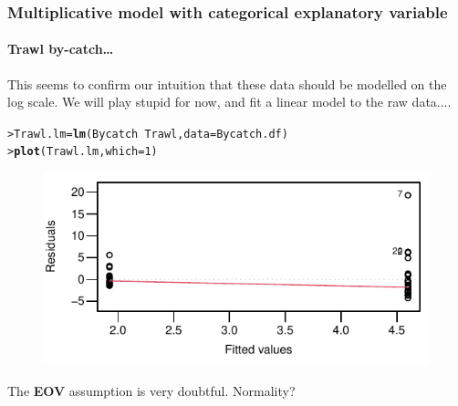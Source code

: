 \documentclass{beamer}\usepackage[]{graphicx}\usepackage[]{xcolor}
\makeatletter
\newcommand{\hlnum}[1]{\textcolor[rgb]{0.686,0.059,0.569}{#1}}%
\newcommand{\hlopt}[1]{\textcolor[rgb]{0,0,0}{#1}}%
\newcommand{\hlstd}[1]{\textcolor[rgb]{0.345,0.345,0.345}{#1}}%
\newcommand{\hlkwb}[1]{\textcolor[rgb]{0.69,0.353,0.396}{#1}}%
\newcommand{\hlkwc}[1]{\textcolor[rgb]{0.333,0.667,0.333}{#1}}%
\newcommand{\hlkwd}[1]{\textcolor[rgb]{0.737,0.353,0.396}{\textbf{#1}}}%
\newenvironment{kframe}{%
 \def\at@end@of@kframe{}%
 \ifinner\ifhmode%
  \def\at@end@of@kframe{\end{minipage}}%
  \begin{minipage}{\columnwidth}%
 \fi\fi%
 \def\FrameCommand##1{\hskip\@totalleftmargin \hskip-\fboxsep
 \colorbox{shadecolor}{##1}\hskip-\fboxsep
     \hskip-\linewidth \hskip-\@totalleftmargin \hskip\columnwidth}%
 \MakeFramed {\advance\hsize-\width
   \@totalleftmargin\z@ \linewidth\hsize
   \@setminipage}}%
 {\par\unskip\endMakeFramed%
 \at@end@of@kframe}
\newenvironment{knitrout}{}{} %
\makeatother
\begin{document}
\begin{frame}[fragile]
\frametitle{Multiplicative model with categorical explanatory variable}
\framesubtitle{Trawl by-catch\ldots}

This seems to confirm our intuition that these data should be modelled on the log scale.
We will play stupid for now, and fit a linear model to the raw data....

\begin{knitrout}\scriptsize
{}\color{fgcolor}\begin{kframe}
\begin{alltt}
\hlstd{> }\hlstd{Trawl.lm}\hlkwb{=}\hlkwd{lm}\hlstd{(Bycatch}\hlopt{~}\hlstd{Trawl,}\hlkwc{data}\hlstd{=Bycatch.df)}
\hlstd{> }\hlkwd{plot}\hlstd{(Trawl.lm,}\hlkwc{which}\hlstd{=}\hlnum{1}\hlstd{)}
\end{alltt}
\end{kframe}
\end{knitrout}






\begin{figure}
  \centering
  \includegraphics{figure/RC-H06-051}
\end{figure}

The \textbf{EOV} assumption is very doubtful. Normality?
\end{frame}
\end{document}
